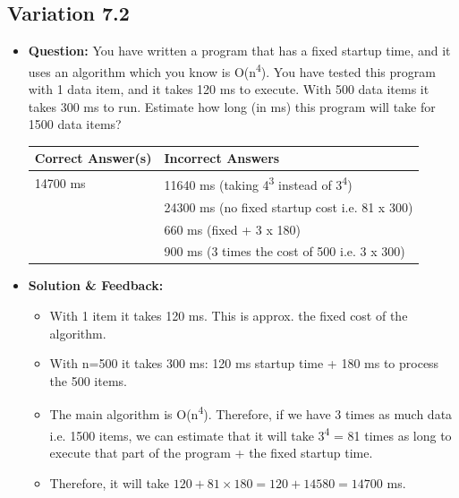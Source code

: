 \subsection{Variation 7.2}
\begin{itemize}
    \item \textbf{Question:} You have written a program that has a fixed startup time, and it uses an algorithm which you know is O(n\textsuperscript{4}). You have tested this program with 1 data item, and it takes 120 ms to execute. With 500 data items it takes 300 ms to run. Estimate how long (in ms) this program will take for 1500 data items?
    
    \begin{tabular}{|l|l|}
        \hline
        \textbf{Correct Answer(s)} & \textbf{Incorrect Answers} \\
        \hline
        14700 ms & 11640 ms (taking 4\textsuperscript{3} instead of 3\textsuperscript{4}) \\
         & 24300 ms (no fixed startup cost i.e. 81 x 300) \\
         & 660 ms (fixed + 3 x 180) \\
         & 900 ms (3 times the cost of 500 i.e. 3 x 300) \\
        \hline
    \end{tabular}
    
    \item \textbf{Solution \& Feedback:}
    \begin{itemize}
        \item With 1 item it takes 120 ms. This is approx. the fixed cost of the algorithm.
        \item With n=500 it takes 300 ms: 120 ms startup time + 180 ms to process the 500 items.
        \item The main algorithm is O(n\textsuperscript{4}). Therefore, if we have 3 times as much data i.e. 1500 items, we can estimate that it will take 3\textsuperscript{4} = 81 times as long to execute that part of the program + the fixed startup time.
        \item Therefore, it will take \( 120 + 81 \times 180 = 120 + 14580 = 14700 \) ms.
    \end{itemize}
\end{itemize}

